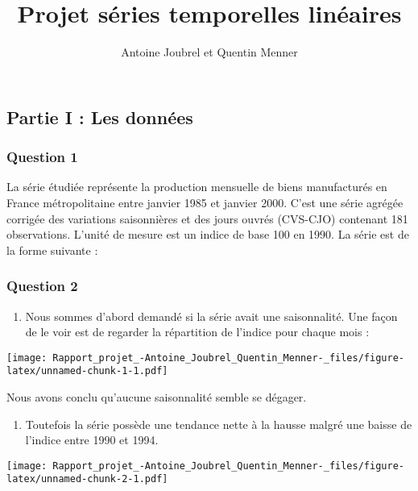 \documentclass[
  landscape]{article}
\title{Projet séries temporelles linéaires}
\author{Antoine Joubrel et Quentin Menner}
\date{}
\providecommand{\tightlist}{%
  \setlength{\itemsep}{0pt}\setlength{\parskip}{0pt}}
\begin{document}
\maketitle

{
\setcounter{tocdepth}{2}
\tableofcontents
}
\hypertarget{partie-i-les-donnuxe9es}{%
\subsection{Partie I : Les données}\label{partie-i-les-donnuxe9es}}

\hypertarget{question-1}{%
\subsubsection{Question 1}\label{question-1}}

La série étudiée représente la production mensuelle de biens
manufacturés en France métropolitaine entre janvier 1985 et janvier
2000. C'est une série agrégée corrigée des variations saisonnières et
des jours ouvrés (CVS-CJO) contenant 181 observations. L'unité de mesure
est un indice de base 100 en 1990. La série est de la forme suivante :

\hypertarget{question-2}{%
\subsubsection{Question 2}\label{question-2}}

\begin{enumerate}
\def\labelenumi{\alph{enumi})}
\tightlist
\item
  Nous sommes d'abord demandé si la série avait une saisonnalité. Une
  façon de le voir est de regarder la répartition de l'indice pour
  chaque mois :
\end{enumerate}

\texttt{[image: Rapport\_projet\_-Antoine\_Joubrel\_Quentin\_Menner-\_files/figure-latex/unnamed-chunk-1-1.pdf]}

Nous avons conclu qu'aucune saisonnalité semble se dégager.

\begin{enumerate}
\def\labelenumi{\alph{enumi})}
\setcounter{enumi}{1}
\tightlist
\item
  Toutefois la série possède une tendance nette à la hausse malgré une
  baisse de l'indice entre 1990 et 1994.
\end{enumerate}

\texttt{[image: Rapport\_projet\_-Antoine\_Joubrel\_Quentin\_Menner-\_files/figure-latex/unnamed-chunk-2-1.pdf]}
\end{document}

